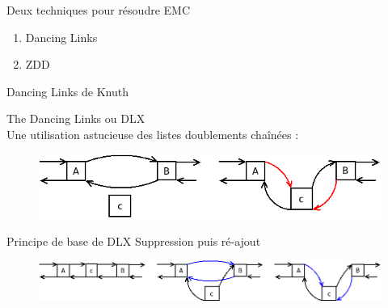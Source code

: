 \documentclass{beamer}
\begin{document}
 \begin{frame}{Deux techniques pour résoudre EMC}

\begin{enumerate}
\item Dancing Links
\item ZDD 
\end{enumerate}




\end{frame}
\begin{frame}{Dancing Links de Knuth}

The Dancing Links ou DLX\\
Une utilisation astucieuse des listes doublements chaînées : 
\begin{figure}[h]
\begin{center}
\includegraphics[scale=0.5]{../imports/add_elmt_dll.png}
\end{center}
\end{figure}
\end{frame}

\begin{frame}{Principe de base de DLX}
Suppression puis ré-ajout
\begin{figure}[h]
\begin{center}
\includegraphics[scale=0.3]{../imports/delete.png}
\end{center}
\end{figure}
\end{frame}
\end{document}
